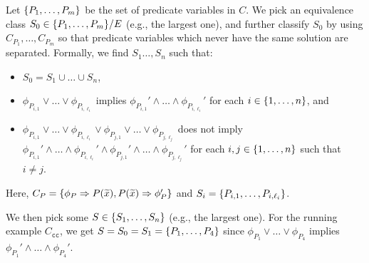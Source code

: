 
Let \(\{{P_1,\dots,P_m}\}\) be the set of predicate variables in \(C\).
We pick an equivalence class \(S_0 \in \{{P_1,\dots,P_m}\} / E\) (e.g.,
the largest one), and further classify \(S_0\) by using
\(C_{P_1},\dots,C_{P_m}\) so that predicate variables which never have
the same solution are separated.
%
Formally, we find \(S_1\dots,S_n\) such that:
\begin{itemize}
\item \(S_0 = S_1 \cup \dots \cup S_n\),
\item \(\phi_{P_{i,1}} \lor \dots \lor\phi_{P_{i,\ell_i}}\) implies
\(\phi_{P_{i,1}}' \land \dots \land\phi_{P_{i,\ell_i}}'\) for each \(i
\in \{{1,\dots,n}\}\), and
\item \(\phi_{P_{i,1}} \lor \dots \lor\phi_{P_{i,\ell_i}} \lor
\phi_{P_{j,1}} \lor \dots \lor\phi_{P_{j,\ell_j}}\) does not imply
\(\phi_{P_{i,1}}' \land \dots \land\phi_{P_{i,\ell_i}}' \land
\phi_{P_{j,1}}' \land \dots \land\phi_{P_{j,\ell_j}}'\) for each \(i,j
\in \{{1,\dots,n}\}\) such that \(i \neq j\).
\end{itemize}
Here, \(C_{P}=\{{\phi_{P} \Rightarrow P(\widetilde{x}),P(\widetilde{x}) \Rightarrow
\phi_{P}'}\}\) and \(S_i=\{{P_{i,1},\dots,P_{i,\ell_i}}\}\).

We then pick some \(S \in \{{S_1,\dots,S_n}\}\) (e.g., the largest one).
 For the running example \(C_{\texttt{cc}}\), we get
\(S=S_0=S_1=\{{P_1,\dots,P_4}\}\) since \(\phi_{P_1} \lor \dots
\lor\phi_{P_4}\) implies \(\phi_{P_1}' \land \dots \land \phi_{P_4}'\).

